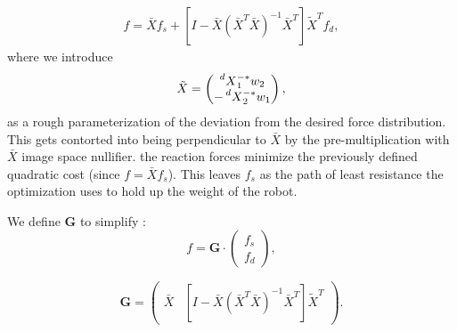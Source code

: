  
\begin{gather}
f = \bar X f_s + \left[I-\bar X(\bar X^T \bar X)^{-1}\bar X^T\right] \tilde X^T f_d,
\end{gather}
where we introduce
\begin{equation}
\tilde X = \begin{pmatrix} \prescript{d}{}{X}_1^{-*} w_2 \\ -\prescript{d}{}{X}_2^{-*} w_1\end{pmatrix},
\end{equation}
as a rough parameterization of the deviation from the desired force distribution. This gets contorted into being perpendicular to $\bar X$ by the pre-multiplication with  $\bar X$ image space nullifier.  the reaction forces minimize the previously defined quadratic cost (since $f = \bar X f_s$). This leaves $f_s$ as the path of least resistance the optimization uses to hold up the weight of the robot.

We define $\mathbf G$ to simplify : 
\begin{equation} f = \mathbf G\cdot \begin{pmatrix} f_s\\f_d\end{pmatrix},\label{eq:G_use}\end{equation}

\begin{equation}
\mathbf G = \begin{pmatrix}
\bar X & \left[I-\bar X(\bar X^T \bar X)^{-1}\bar X^T\right] \tilde X^T
\end{pmatrix}.\label{eq:G_def}
\end{equation}

